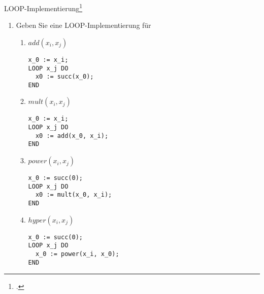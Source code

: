 \documentclass{bschlangaul-aufgabe}
\begin{document}

LOOP-Implementierung\footcite[Seite 11]{theo:fs:4}

\begin{enumerate}
\item Geben Sie eine LOOP-Implementierung für

\begin{enumerate}

%

\item $add(x_i, x_j)$

\begin{bAntwort}
\begin{verbatim}
x_0 := x_i;
LOOP x_j DO
  x0 := succ(x_0);
END
\end{verbatim}
\end{bAntwort}

%

\item $mult(x_i, x_j)$

\begin{bAntwort}
\begin{verbatim}
x_0 := x_i;
LOOP x_j DO
  x0 := add(x_0, x_i);
END
\end{verbatim}
\end{bAntwort}

%

\item $power(x_i, x_j)$

\begin{bAntwort}
\begin{verbatim}
x_0 := succ(0);
LOOP x_j DO
  x0 := mult(x_0, x_i);
END
\end{verbatim}
\end{bAntwort}

%

\item $hyper(x_i, x_j)$

\begin{bAntwort}
\begin{verbatim}
x_0 := succ(0);
LOOP x_j DO
  x_0 := power(x_i, x_0);
END
\end{verbatim}
\end{bAntwort}


\end{enumerate}
\end{enumerate}
\end{document}

